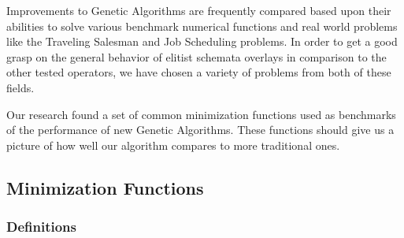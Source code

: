 Improvements to Genetic Algorithms are frequently compared based upon their abilities to solve various benchmark numerical functions and real world problems like the Traveling Salesman and Job Scheduling problems\cite{molga05}. In order to get a good grasp on the general behavior of elitist schemata overlays in comparison to the other tested operators, we have chosen a variety of problems from both of these fields. 

Our research found a set of common minimization functions used as benchmarks of the performance of new Genetic Algorithms\cite{Deb99,Eiben95,Tsutsui99}. These functions should give us a picture of how well our algorithm compares to more traditional ones. 

\subsection*{Minimization Functions}
\subsubsection*{Definitions}

